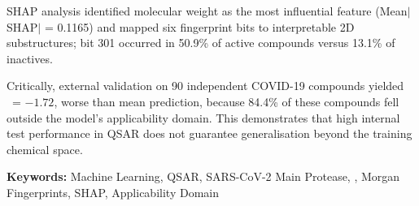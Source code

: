 SHAP analysis identified molecular weight as the most influential feature (Mean$|$SHAP$|$ = 0.1165) and mapped six fingerprint bits to interpretable 2D substructures; bit 301 occurred in 50.9\% of active compounds versus 13.1\% of inactives.

Critically, external validation on 90 independent COVID-19 compounds yielded \Rsq\ = $-1.72$, worse than mean prediction, because 84.4\% of these compounds fell outside the model's applicability domain. This demonstrates that high internal test performance in QSAR does not guarantee generalisation beyond the training chemical space.

\vspace{0.8em}
\noindent\textbf{Keywords:} Machine Learning, QSAR, SARS-CoV-2 Main Protease, \pICfifty, Morgan Fingerprints, SHAP, Applicability Domain
